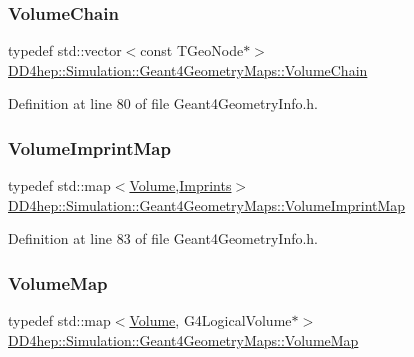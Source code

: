 \subsubsection{\texorpdfstring{Volume\+Chain}{VolumeChain}}
{\footnotesize\ttfamily typedef std\+::vector$<$const T\+Geo\+Node$\ast$$>$ \hyperlink{namespace_d_d4hep_1_1_simulation_1_1_geant4_geometry_maps_a23aa6ab8c70ef8f0c800d00db6a7bb53}{D\+D4hep\+::\+Simulation\+::\+Geant4\+Geometry\+Maps\+::\+Volume\+Chain}}



Definition at line 80 of file Geant4\+Geometry\+Info.\+h.

\hypertarget{namespace_d_d4hep_1_1_simulation_1_1_geant4_geometry_maps_aade714d6f596f4d83009dcc2f3968d86}{}\label{namespace_d_d4hep_1_1_simulation_1_1_geant4_geometry_maps_aade714d6f596f4d83009dcc2f3968d86} 
\subsubsection{\texorpdfstring{Volume\+Imprint\+Map}{VolumeImprintMap}}
{\footnotesize\ttfamily typedef std\+::map$<$\hyperlink{class_d_d4hep_1_1_geometry_1_1_volume}{Volume},\hyperlink{namespace_d_d4hep_1_1_simulation_1_1_geant4_geometry_maps_a44385b9a0b879f5b5a4f11c606cbd968}{Imprints}$>$ \hyperlink{namespace_d_d4hep_1_1_simulation_1_1_geant4_geometry_maps_aade714d6f596f4d83009dcc2f3968d86}{D\+D4hep\+::\+Simulation\+::\+Geant4\+Geometry\+Maps\+::\+Volume\+Imprint\+Map}}



Definition at line 83 of file Geant4\+Geometry\+Info.\+h.

\hypertarget{namespace_d_d4hep_1_1_simulation_1_1_geant4_geometry_maps_a85199a23e6a837678c8e5d5f902fb2e2}{}\label{namespace_d_d4hep_1_1_simulation_1_1_geant4_geometry_maps_a85199a23e6a837678c8e5d5f902fb2e2} 
\subsubsection{\texorpdfstring{Volume\+Map}{VolumeMap}}
{\footnotesize\ttfamily typedef std\+::map$<$\hyperlink{class_d_d4hep_1_1_geometry_1_1_volume}{Volume}, G4\+Logical\+Volume$\ast$$>$ \hyperlink{namespace_d_d4hep_1_1_simulation_1_1_geant4_geometry_maps_a85199a23e6a837678c8e5d5f902fb2e2}{D\+D4hep\+::\+Simulation\+::\+Geant4\+Geometry\+Maps\+::\+Volume\+Map}}



